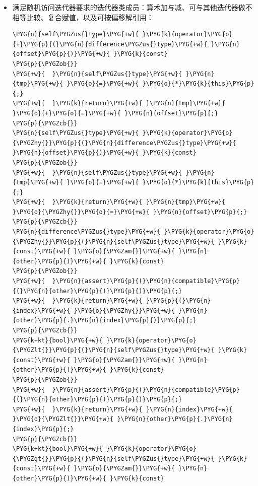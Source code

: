 \begin{itemize}

\item 满足随机访问迭代器要求的迭代器类成员：算术加与减、可与其他迭代器做不相等比较、复合赋值，以及可按偏移解引用：



\begin{codeblockbg}
\begin{Verbatim}[commandchars=\\\{\},breaklines=true,breakanywhere=true,fontsize=\codefont,xleftmargin=17bp]
\PYG{n}{self\PYGZus{}type}\PYG{+w}{ }\PYG{k}{operator}\PYG{o}{+}\PYG{p}{(}\PYG{n}{difference\PYGZus{}type}\PYG{+w}{ }\PYG{n}{offset}\PYG{p}{)}\PYG{+w}{ }\PYG{k}{const}
\PYG{p}{\PYGZob{}}
\PYG{+w}{  }\PYG{n}{self\PYGZus{}type}\PYG{+w}{ }\PYG{n}{tmp}\PYG{+w}{ }\PYG{o}{=}\PYG{+w}{ }\PYG{o}{*}\PYG{k}{this}\PYG{p}{;}
\PYG{+w}{  }\PYG{k}{return}\PYG{+w}{ }\PYG{n}{tmp}\PYG{+w}{ }\PYG{o}{+}\PYG{o}{=}\PYG{+w}{ }\PYG{n}{offset}\PYG{p}{;}
\PYG{p}{\PYGZcb{}}
\PYG{n}{self\PYGZus{}type}\PYG{+w}{ }\PYG{k}{operator}\PYG{o}{\PYGZhy{}}\PYG{p}{(}\PYG{n}{difference\PYGZus{}type}\PYG{+w}{ }\PYG{n}{offset}\PYG{p}{)}\PYG{+w}{ }\PYG{k}{const}
\PYG{p}{\PYGZob{}}
\PYG{+w}{  }\PYG{n}{self\PYGZus{}type}\PYG{+w}{ }\PYG{n}{tmp}\PYG{+w}{ }\PYG{o}{=}\PYG{+w}{ }\PYG{o}{*}\PYG{k}{this}\PYG{p}{;}
\PYG{+w}{  }\PYG{k}{return}\PYG{+w}{ }\PYG{n}{tmp}\PYG{+w}{ }\PYG{o}{\PYGZhy{}}\PYG{o}{=}\PYG{+w}{ }\PYG{n}{offset}\PYG{p}{;}
\PYG{p}{\PYGZcb{}}
\PYG{n}{difference\PYGZus{}type}\PYG{+w}{ }\PYG{k}{operator}\PYG{o}{\PYGZhy{}}\PYG{p}{(}\PYG{n}{self\PYGZus{}type}\PYG{+w}{ }\PYG{k}{const}\PYG{+w}{ }\PYG{o}{\PYGZam{}}\PYG{+w}{ }\PYG{n}{other}\PYG{p}{)}\PYG{+w}{ }\PYG{k}{const}
\PYG{p}{\PYGZob{}}
\PYG{+w}{  }\PYG{n}{assert}\PYG{p}{(}\PYG{n}{compatible}\PYG{p}{(}\PYG{n}{other}\PYG{p}{)}\PYG{p}{)}\PYG{p}{;}
\PYG{+w}{  }\PYG{k}{return}\PYG{+w}{ }\PYG{p}{(}\PYG{n}{index}\PYG{+w}{ }\PYG{o}{\PYGZhy{}}\PYG{+w}{ }\PYG{n}{other}\PYG{p}{.}\PYG{n}{index}\PYG{p}{)}\PYG{p}{;}
\PYG{p}{\PYGZcb{}}
\PYG{k+kt}{bool}\PYG{+w}{ }\PYG{k}{operator}\PYG{o}{\PYGZlt{}}\PYG{p}{(}\PYG{n}{self\PYGZus{}type}\PYG{+w}{ }\PYG{k}{const}\PYG{+w}{ }\PYG{o}{\PYGZam{}}\PYG{+w}{ }\PYG{n}{other}\PYG{p}{)}\PYG{+w}{ }\PYG{k}{const}
\PYG{p}{\PYGZob{}}
\PYG{+w}{  }\PYG{n}{assert}\PYG{p}{(}\PYG{n}{compatible}\PYG{p}{(}\PYG{n}{other}\PYG{p}{)}\PYG{p}{)}\PYG{p}{;}
\PYG{+w}{  }\PYG{k}{return}\PYG{+w}{ }\PYG{n}{index}\PYG{+w}{ }\PYG{o}{\PYGZlt{}}\PYG{+w}{ }\PYG{n}{other}\PYG{p}{.}\PYG{n}{index}\PYG{p}{;}
\PYG{p}{\PYGZcb{}}
\PYG{k+kt}{bool}\PYG{+w}{ }\PYG{k}{operator}\PYG{o}{\PYGZgt{}}\PYG{p}{(}\PYG{n}{self\PYGZus{}type}\PYG{+w}{ }\PYG{k}{const}\PYG{+w}{ }\PYG{o}{\PYGZam{}}\PYG{+w}{ }\PYG{n}{other}\PYG{p}{)}\PYG{+w}{ }\PYG{k}{const}

\end{Verbatim}
\end{codeblockbg}
\end{itemize}
